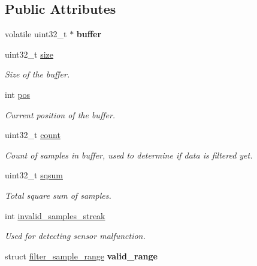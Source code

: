 \subsection*{Public Attributes}
\begin{DoxyCompactItemize}
\item 
\hypertarget{structfilter__rms_a54520c4d0cb0f9441f4c57eacf5bfd78}{}volatile uint32\+\_\+t $\ast$ {\bfseries buffer}\label{structfilter__rms_a54520c4d0cb0f9441f4c57eacf5bfd78}

\item 
uint32\+\_\+t \hyperlink{structfilter__rms_a8581be35641ea200e6bf23ce48f76196}{size}
\begin{DoxyCompactList}\small\item\em Size of the buffer. \end{DoxyCompactList}\item 
int \hyperlink{structfilter__rms_a85d467406ed373c2ad1a134860fd24bd}{pos}
\begin{DoxyCompactList}\small\item\em Current position of the buffer. \end{DoxyCompactList}\item 
uint32\+\_\+t \hyperlink{structfilter__rms_a42976cc476c577216f312bcd496eb79b}{count}
\begin{DoxyCompactList}\small\item\em Count of samples in buffer, used to determine if data is filtered yet. \end{DoxyCompactList}\item 
uint32\+\_\+t \hyperlink{structfilter__rms_a902e6aa671bf468ba0506ef5848f51cf}{sqsum}
\begin{DoxyCompactList}\small\item\em Total square sum of samples. \end{DoxyCompactList}\item 
int \hyperlink{structfilter__rms_a00a96dc7cf61e9c2643fdefc3d558ff2}{invalid\+\_\+samples\+\_\+streak}
\begin{DoxyCompactList}\small\item\em Used for detecting sensor malfunction. \end{DoxyCompactList}\item 
\hypertarget{structfilter__rms_abcd2a21aa49c2abb148493265da1efa5}{}struct \hyperlink{structfilter__sample__range}{filter\+\_\+sample\+\_\+range} {\bfseries valid\+\_\+range}\label{structfilter__rms_abcd2a21aa49c2abb148493265da1efa5}

\end{DoxyCompactItemize}



